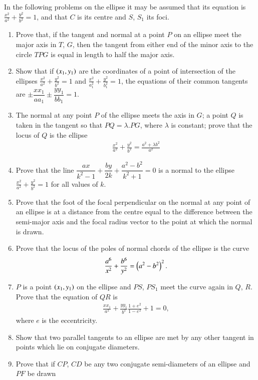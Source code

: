 In the following problems on the ellipse it may be assumed that its equation is $\frac{x^2}{a^2}+\frac{y^2}{b^2}=1$, 
and that $C$ is its centre and $S$, $S_1$ its foci.
\begin{enumerate}[1.]
\item Prove that, if the tangent and normal at a point $P$ on an ellipse meet the major axis
in $T$, $G$, then the tangent from either end of the minor axis to the circle $TPG$ is equal in length to half the major
axis.
\item Show that if $\left(x_1,y_1\right)$ are the coordinates of a point of intersection of the ellipses $\frac{x^2}{a^2}+\frac{y^2}{b^2}=1$ and $\frac{x^2}{a_1^2}+\frac{y^2}{b_1^2}=1$, the equations of their common tangents are $\pm \dfrac{xx_1}{aa_1}\pm \dfrac{yy_1}{bb_1}=1$.
\item The normal at any point $P$ of the ellipse meets the axis in $G$; a point $Q$ is taken in the
tangent so that $PQ=\lambda.PG$, where $\lambda$ is constant; prove that the locus of $Q$ is the ellipse
\begin{align*}
\frac{x^2}{a^2}+\frac{y^2}{b^2}=\frac{a^2+\lambda b^2}{a^2}
\end{align*}
\item Prove that the line $\dfrac{ax}{k^2-1}+\dfrac{by}{2k}+\dfrac{a^2-b^2}{k^2+1} = 0$ is a normal to the ellipse 
$\frac{x^2}{a^2}+\frac{y^2}{b^2}=1$ for all values of $k$.
\item Prove that the foot of the focal perpendicular on the normal at any point of an ellipse is at
a distance from the centre equal to the difference between the semi-major axis and the focal
radius vector to the point at which the normal is drawn.
\item Prove that the locus of the poles of normal chords of the ellipse is the curve
\begin{align*}
\frac{a^6}{x^2}+\frac{b^6}{y^2}=\left(a^2-b^2\right)^2.
\end{align*}
\item $P$ is a point $\left(x_1,y_1\right)$ on the ellipse and $PS$, $PS_1$ meet the curve again in $Q$, $R$.  Prove that
the equation of $QR$ is 
\begin{align*}
\frac{xx_1}{a^2}+\frac{yy_1}{b^2}\frac{1+e^2}{1-e^2} + 1 = 0,
\end{align*}
where $e$ is the eccentricity.
\item Show that two parallel tangents to an ellipse are met by any other tangent in points
which lie on conjugate diameters.
\item Prove that if $CP$, $CD$ be any two conjugate semi-diameters of an ellipse and $PF$ be drawn

\end{enumerate}
